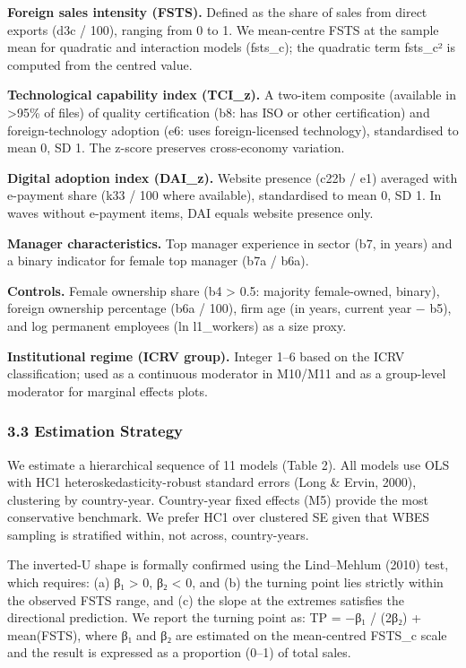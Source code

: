 \documentclass[12pt,a4paper]{article}
\begin{document}
\textbf{Foreign sales intensity (FSTS).} Defined as the share of sales
from direct exports (d3c / 100), ranging from 0 to 1. We mean-centre
FSTS at the sample mean for quadratic and interaction models (fsts\_c);
the quadratic term fsts\_c² is computed from the centred value.

\textbf{Technological capability index (TCI\_z).} A two-item composite
(available in \textgreater95\% of files) of quality certification (b8:
has ISO or other certification) and foreign-technology adoption (e6:
uses foreign-licensed technology), standardised to mean 0, SD 1. The
z-score preserves cross-economy variation.

\textbf{Digital adoption index (DAI\_z).} Website presence (c22b / e1)
averaged with e-payment share (k33 / 100 where available), standardised
to mean 0, SD 1. In waves without e-payment items, DAI equals website
presence only.

\textbf{Manager characteristics.} Top manager experience in sector (b7,
in years) and a binary indicator for female top manager (b7a / b6a).

\textbf{Controls.} Female ownership share (b4 \textgreater{} 0.5:
majority female-owned, binary), foreign ownership percentage (b6a /
100), firm age (in years, current year − b5), and log permanent
employees (ln l1\_workers) as a size proxy.

\textbf{Institutional regime (ICRV group).} Integer 1--6 based on the
ICRV classification; used as a continuous moderator in M10/M11 and as a
group-level moderator for marginal effects plots.

\hypertarget{33-estimation-strategy}{%
\subsubsection{3.3 Estimation Strategy}\label{33-estimation-strategy}}

We estimate a hierarchical sequence of 11 models (Table 2). All models
use OLS with HC1 heteroskedasticity-robust standard errors (Long \&
Ervin, 2000), clustering by country-year. Country-year fixed effects
(M5) provide the most conservative benchmark. We prefer HC1 over
clustered SE given that WBES sampling is stratified within, not across,
country-years.

The inverted-U shape is formally confirmed using the Lind--Mehlum (2010)
test, which requires: (a) β₁ \textgreater{} 0, β₂ \textless{} 0, and (b)
the turning point lies strictly within the observed FSTS range, and (c)
the slope at the extremes satisfies the directional prediction. We
report the turning point as: TP = −β₁ / (2β₂) + mean(FSTS), where β₁ and
β₂ are estimated on the mean-centred FSTS\_c scale and the result is
expressed as a proportion (0--1) of total sales.
\end{document}
